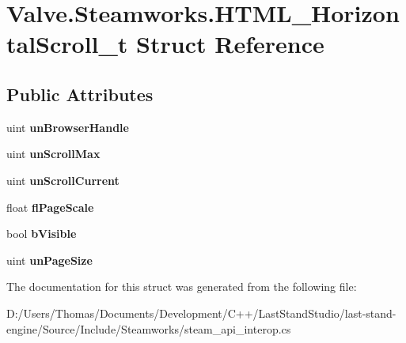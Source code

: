 \hypertarget{structValve_1_1Steamworks_1_1HTML__HorizontalScroll__t}{}\section{Valve.\+Steamworks.\+H\+T\+M\+L\+\_\+\+Horizontal\+Scroll\+\_\+t Struct Reference}
\label{structValve_1_1Steamworks_1_1HTML__HorizontalScroll__t}
\subsection*{Public Attributes}
\begin{DoxyCompactItemize}
\item 
\hypertarget{structValve_1_1Steamworks_1_1HTML__HorizontalScroll__t_a1a1c34dfe3408af700b1ead45ba89178}{}uint {\bfseries un\+Browser\+Handle}\label{structValve_1_1Steamworks_1_1HTML__HorizontalScroll__t_a1a1c34dfe3408af700b1ead45ba89178}

\item 
\hypertarget{structValve_1_1Steamworks_1_1HTML__HorizontalScroll__t_aa33e63c3a3e3c41b46e7ad492fbcfcee}{}uint {\bfseries un\+Scroll\+Max}\label{structValve_1_1Steamworks_1_1HTML__HorizontalScroll__t_aa33e63c3a3e3c41b46e7ad492fbcfcee}

\item 
\hypertarget{structValve_1_1Steamworks_1_1HTML__HorizontalScroll__t_a52dc22722ad696f65c888e7917a6e1b1}{}uint {\bfseries un\+Scroll\+Current}\label{structValve_1_1Steamworks_1_1HTML__HorizontalScroll__t_a52dc22722ad696f65c888e7917a6e1b1}

\item 
\hypertarget{structValve_1_1Steamworks_1_1HTML__HorizontalScroll__t_a25241a213fc7640406e8faf0f78be936}{}float {\bfseries fl\+Page\+Scale}\label{structValve_1_1Steamworks_1_1HTML__HorizontalScroll__t_a25241a213fc7640406e8faf0f78be936}

\item 
\hypertarget{structValve_1_1Steamworks_1_1HTML__HorizontalScroll__t_a4b460e906e372f618482efbc3c74bb8a}{}bool {\bfseries b\+Visible}\label{structValve_1_1Steamworks_1_1HTML__HorizontalScroll__t_a4b460e906e372f618482efbc3c74bb8a}

\item 
\hypertarget{structValve_1_1Steamworks_1_1HTML__HorizontalScroll__t_aad4aa707fccb1308b1109d8886d73d56}{}uint {\bfseries un\+Page\+Size}\label{structValve_1_1Steamworks_1_1HTML__HorizontalScroll__t_aad4aa707fccb1308b1109d8886d73d56}

\end{DoxyCompactItemize}


The documentation for this struct was generated from the following file\+:\begin{DoxyCompactItemize}
\item 
D\+:/\+Users/\+Thomas/\+Documents/\+Development/\+C++/\+Last\+Stand\+Studio/last-\/stand-\/engine/\+Source/\+Include/\+Steamworks/steam\+\_\+api\+\_\+interop.\+cs\end{DoxyCompactItemize}
